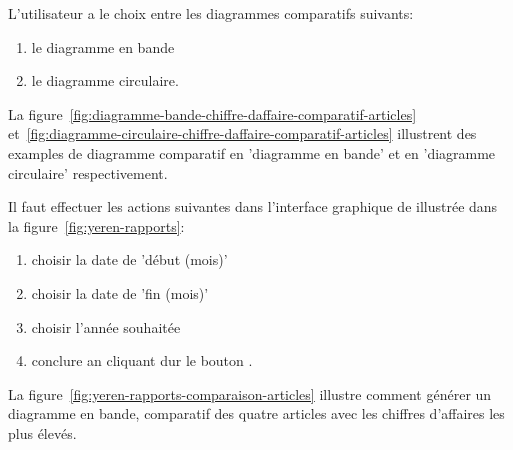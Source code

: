 L'utilisateur a le choix entre les diagrammes comparatifs
suivants:
\begin{enumerate}[1)]
	\item le diagramme en bande
	\item le diagramme circulaire.\\
\end{enumerate}

La figure~\ref{fig:diagramme-bande-chiffre-daffaire-comparatif-articles}
et~\ref{fig:diagramme-circulaire-chiffre-daffaire-comparatif-articles}
illustrent des examples de diagramme comparatif en 'diagramme en bande'
et en 'diagramme circulaire' respectivement.

\label{sec:evolution-chiffre-affaire}

Il faut effectuer les actions suivantes dans l'interface
graphique de \yeren illustr\'ee dans la
figure~\ref{fig:yeren-rapports}:

\begin{enumerate}[1)]
	\item choisir la date de 'd\'ebut (mois)'
	\item choisir la date de 'fin (mois)'	
	\item choisir l'ann\'ee souhait\'ee
	\item conclure an cliquant dur le
		bouton .
\end{enumerate}

\newpage
{}\label{sec:comparaison-chiffre-affaire-articles}

La figure~\ref{fig:yeren-rapports-comparaison-articles}
illustre comment g\'en\'erer un diagramme en bande,
comparatif des quatre articles avec les chiffres d'affaires
les plus \'elev\'es.\\

